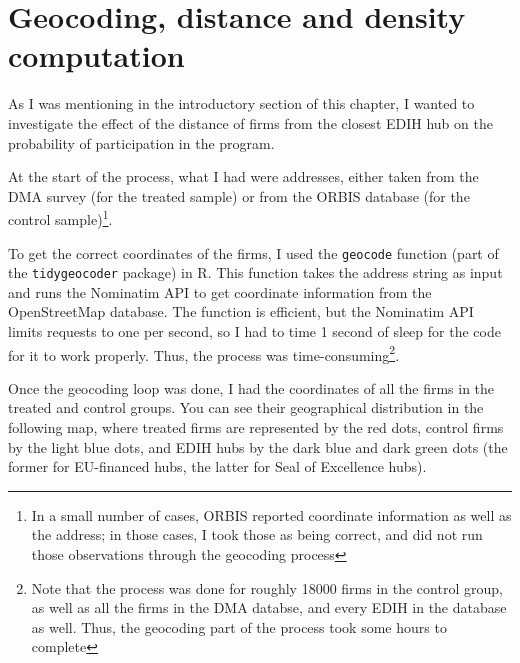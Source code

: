 \documentclass[12pt]{report}
\begin{document}
\section{Geocoding, distance and density computation}

\par As I was mentioning in the introductory section of this chapter, I wanted to investigate the effect of the distance of firms from the closest EDIH hub on the probability of participation in the program. 
\par At the start of the process, what I had were addresses, either taken from the DMA survey (for the treated sample) or from the ORBIS database (for the control sample)\footnote{In a small number of cases, ORBIS reported coordinate information as well as the address; in those cases, I took those as being correct, and did not run those observations through the geocoding process}.
\par To get the correct coordinates of the firms, I used the \texttt{geocode} function (part of the \texttt{tidygeocoder} package) in R. This function takes the address string as input and runs the Nominatim API to get coordinate information from the OpenStreetMap database. The function is efficient, but the Nominatim API limits requests to one per second, so I had to time 1 second of sleep for the code for it to work properly. Thus, the process was time-consuming\footnote{Note that the process was done for roughly 18000 firms in the control group, as well as all the firms in the DMA databse, and every EDIH in the database as well. Thus, the geocoding part of the process took some hours to complete}.

\par Once the geocoding loop was done, I had the coordinates of all the firms in the treated and control groups. You can see their geographical distribution in the following map, where treated firms are represented by the red dots, control firms by the light blue dots, and EDIH hubs by the dark blue and dark green dots (the former for EU-financed hubs, the latter for Seal of Excellence hubs).
\end{document}
